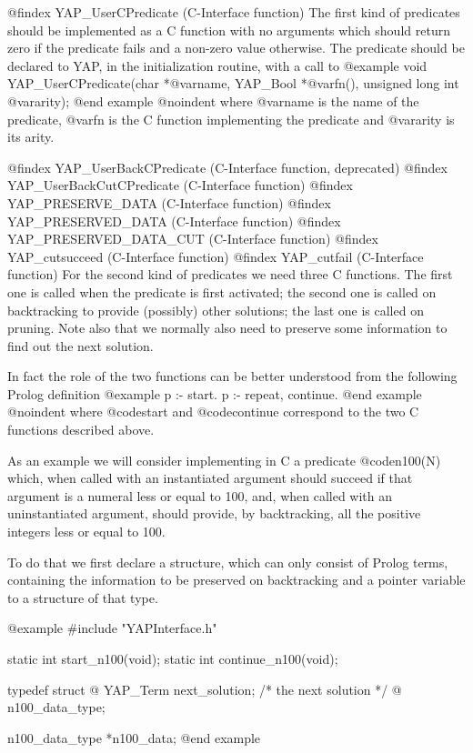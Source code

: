 {{{{{{{{{@findex YAP_UserCPredicate (C-Interface function)
The first kind of predicates should be implemented as a C function with
no arguments which should return zero if the predicate fails and a
non-zero value otherwise. The predicate should be declared to
YAP, in the initialization routine, with a call to
@example
      void YAP_UserCPredicate(char *@var{name}, YAP_Bool *@var{fn}(), unsigned long int @var{arity});
@end example
@noindent
where @var{name} is the name of the predicate, @var{fn} is the C function
implementing the predicate and @var{arity} is its arity.

@findex YAP_UserBackCPredicate (C-Interface function, deprecated)
@findex YAP_UserBackCutCPredicate (C-Interface function)
@findex YAP_PRESERVE_DATA (C-Interface function)
@findex YAP_PRESERVED_DATA (C-Interface function)
@findex YAP_PRESERVED_DATA_CUT (C-Interface function)
@findex YAP_cutsucceed (C-Interface function)
@findex YAP_cutfail (C-Interface function)
For the second kind of predicates we need three C functions. The first one
 is called when the predicate is first activated; the second one
is called on backtracking to provide (possibly) other solutions; the
 last one is called on pruning. Note
also that we normally also need to preserve some information to find out
the next solution.

In fact the role of the two functions can be better understood from the
following Prolog definition
@example
       p :- start.
       p :- repeat,
                continue.
@end example
@noindent
where @code{start} and @code{continue} correspond to the two C functions
described above.


As an example we will consider implementing in C a predicate @code{n100(N)}
which, when called with an instantiated argument should succeed if that
argument is a numeral less or equal to 100, and, when called with an
uninstantiated argument, should provide, by backtracking, all the positive
integers less or equal to 100.

   To do that we first declare a structure, which can only consist
of Prolog terms, containing the information to be preserved on backtracking
and a pointer variable to a structure of that type.

@example
#include "YAPInterface.h"

static int start_n100(void);
static int continue_n100(void);

typedef struct @{
    YAP_Term next_solution;  /* the next solution */
   @} n100_data_type;

n100_data_type *n100_data;
@end example

}}}}}}}}}
